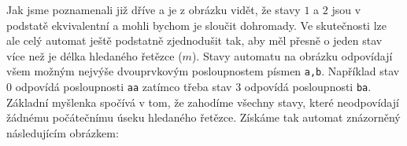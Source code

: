 \begin{center}
\end{center}

Jak jsme poznamenali již dříve a je z obrázku vidět, že stavy \(1\) a \(2\) jsou v podstatě ekvivalentní a mohli bychom je sloučit
dohromady.  Ve skutečnosti lze ale celý automat ještě podstatně zjednodušit tak, aby
měl přesně o jeden stav více než je délka hledaného řetězce (\(m\)).  Stavy automatu
na obrázku odpovídají všem možným nejvýše dvouprvkovým posloupnostem písmen
{\tt a,b}.  Například stav \(0\) odpovídá posloupnosti {\tt aa} zatímco třeba stav \(3\)
odpovídá posloupnosti {\tt ba}. Základní myšlenka spočívá v tom, že zahodíme všechny
stavy, které neodpovídají žádnému počátečnímu úseku hledaného řetězce.
Získáme tak automat znázorněný následujícím obrázkem:

